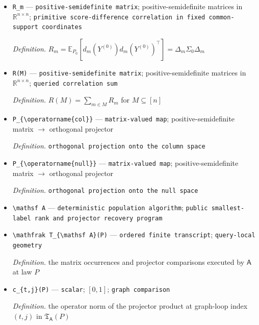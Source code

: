 \documentclass{article}
\begin{document}
\begin{itemize}
  \item \texttt{R\_\allowbreak{}m} --- \texttt{positive-\allowbreak{}semidefinite matrix}; positive-semidefinite matrices in \(\mathbb R^{n\times n}\); \texttt{primitive score-\allowbreak{}difference correlation in fixed common-\allowbreak{}support coordinates}
  \par\smallskip\noindent\emph{Definition.} \(R_m=\mathbb E_{P_0}[d_m(Y^{(0)})d_m(Y^{(0)})^{\top}]=\Delta_m\Sigma_0\Delta_m\)
  \item \texttt{R(M)} --- \texttt{positive-\allowbreak{}semidefinite matrix}; positive-semidefinite matrices in \(\mathbb R^{n\times n}\); \texttt{queried correlation sum}
  \par\smallskip\noindent\emph{Definition.} \(R(M)=\sum_{m\in M}R_m\) for \(M\subseteq[n]\)
  \item \texttt{P\_\allowbreak{}\{\textbackslash{}\allowbreak{}operatorname\{col\}\allowbreak{}\}\allowbreak{}} --- \texttt{matrix-\allowbreak{}valued map}; positive-semidefinite matrix \(\to\) orthogonal projector
  \par\smallskip\noindent\emph{Definition.} \texttt{orthogonal projection onto the column space}
  \item \texttt{P\_\allowbreak{}\{\textbackslash{}\allowbreak{}operatorname\{null\}\allowbreak{}\}\allowbreak{}} --- \texttt{matrix-\allowbreak{}valued map}; positive-semidefinite matrix \(\to\) orthogonal projector
  \par\smallskip\noindent\emph{Definition.} \texttt{orthogonal projection onto the null space}
  \item \texttt{\textbackslash{}\allowbreak{}mathsf A} --- \texttt{deterministic population algorithm}; \texttt{public smallest-\allowbreak{}label rank and projector recovery program}
  \item \texttt{\textbackslash{}\allowbreak{}mathfrak T\_\allowbreak{}\{\textbackslash{}\allowbreak{}mathsf A\}\allowbreak{}(P)} --- \texttt{ordered finite transcript}; \texttt{query-\allowbreak{}local geometry}
  \par\smallskip\noindent\emph{Definition.} the matrix occurrences and projector comparisons executed by \(\mathsf A\) at law \(P\)
  \item \texttt{c\_\allowbreak{}\{t,\allowbreak{}j\}\allowbreak{}(P)} --- \texttt{scalar}; \([0,1]\); \texttt{graph comparison}
  \par\smallskip\noindent\emph{Definition.} the operator norm of the projector product at graph-loop index \((t,j)\) in \(\mathfrak T_{\mathsf A}(P)\)

\end{itemize}
\end{document}
